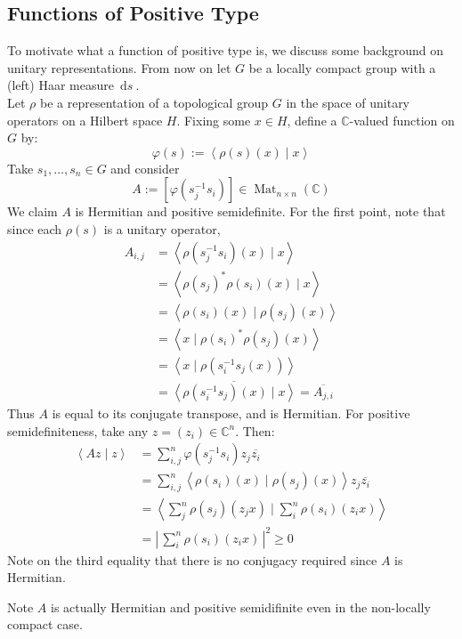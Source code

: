 \documentclass[11pt, x11names]{article}
\newcommand{\cc}{\mathbb{C}}
\renewcommand{\bar}[1]{\overline{#1}}
\newcommand{\brangle}[1]{\left\langle #1 \right\rangle}
\newcommand{\abs}[1]{\left| \, #1  \,\right|}
\newcommand{\sqbrack}[1]{\left[ #1 \right]}
\newcommand{\inv}[1]{#1^{-1}}
\DeclareMathOperator{\mat}{Mat}
\newcommand{\ds}{\, \mathrm{d}s \ }
\begin{document}
\subsection{Functions of Positive Type}
\label{subsection: Positive Type Funcs}
To motivate what a function of positive type is, we discuss some background on unitary representations. From now on let $G$ be a locally compact group with a (left) Haar measure $\ds$.\\

Let $\rho$ be a representation of a topological group $G$ in the space of unitary operators on a Hilbert space $H$. Fixing some $x \in H$, define a $\cc$-valued function on $G$ by:
\begin{equation*}
    \varphi(s) := \brangle{\rho(s)(x) \mid x}
\end{equation*}
Take $s_1, \ldots, s_n \in G$ and consider
\begin{equation*}
    A := \sqbrack{\varphi(\inv{s_j}s_i)} \in \mat_{n \times n}(\cc)
\end{equation*}
We claim $A$ is Hermitian and positive semidefinite. For the first point, note that since each $\rho(s)$ is a unitary operator,
\begin{equation*}
\begin{split}
    A_{i, j} &= \brangle{\rho(\inv{s_j}s_i)(x) \mid x}\\ 
    &= \brangle{\rho(s_j)^* \rho(s_i)(x) \mid x}\\
    &= \brangle{\rho(s_i)(x) \mid \rho(s_j)(x)}\\
    &= \brangle{x \mid \rho(s_i)^* \rho(s_j)(x)}\\
    &= \brangle{x \mid \rho(\inv{s_i}s_j(x))}\\
    &= \bar{\brangle{\rho(\inv{s_i}s_j)(x) \mid x}} = \bar{A_{j, i}}
\end{split}
\end{equation*}
Thus $A$ is equal to its conjugate transpose, and is Hermitian. For positive semidefiniteness, take any $z = (z_i) \in \cc^n$. Then:
\begin{equation*}
    \begin{split}
        \brangle{Az \mid z} &= \sum^n_{i, j} \varphi(\inv{s_j}s_i)z_j \bar{z_i}\\
        &= \sum^n_{i, j} \brangle{\rho(s_i)(x) \mid \rho(s_j)(x)}z_j \bar{z_i}\\
        &= \brangle{\sum^n_{j} \rho(s_j)(z_j x) \mid \sum^n_{i} \rho(s_i)(z_ix)}\\
        &= \abs{\sum^n_i \rho(s_i)(z_i x)}^2 \geq 0
    \end{split}
\end{equation*}
Note on the third equality that there is no conjugacy required since $A$ is Hermitian.
\begin{remark}
    Note $A$ is actually Hermitian and positive semidifinite even in the non-locally compact case.
\end{remark}
\end{document}
